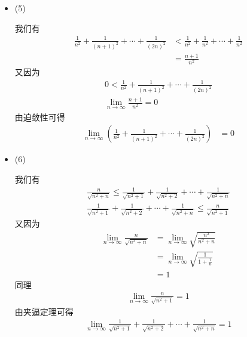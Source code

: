 \documentclass{article}
\begin{document}
\begin{itemize}
  \item (5)

        我们有
        \begin{align*}
          \frac{1}{n^2} + \frac{1}{(n + 1)^2} + \cdots + \frac{1}{(2n)^2}
           & < \frac{1}{n^2} + \frac{1}{n^2} + \cdots + \frac{1}{n^2} \\
           & = \frac{n + 1}{n^2}
        \end{align*}
        又因为
        \begin{align*}
          0 < \frac{1}{n^2} + \frac{1}{(n + 1)^2} + \cdots + \frac{1}{(2n)^2} \\
          \lim\limits_{n \to \infty} \frac{n + 1}{n^2} = 0
        \end{align*}
        由迫敛性可得
        \begin{align*}
          \lim\limits_{n \to \infty} \left(\frac{1}{n^2} + \frac{1}{(n + 1)^2} + \cdots + \frac{1}{(2n)^2}\right)
           & = 0
        \end{align*}

  \item (6)

        我们有
        \begin{align*}
          \frac{n}{\sqrt{n^2 + n}} \leq \frac{1}{\sqrt{n^2 + 1}} + \frac{1}{\sqrt{n^2 + 2}} + \cdots + \frac{1}{\sqrt{n^2 + n}} \\
          \frac{1}{\sqrt{n^2 + 1}} + \frac{1}{\sqrt{n^2 + 2}} + \cdots + \frac{1}{\sqrt{n^2 + n}} \leq \frac{n}{\sqrt{n^2 + 1}}
        \end{align*}
        又因为
        \begin{align*}
          \lim\limits_{n \to \infty} \frac{n}{\sqrt{n^2 + n}}
           & = \lim\limits_{n \to \infty} \sqrt{\frac{n^2}{n^2 + n}}       \\
           & = \lim\limits_{n \to \infty} \sqrt{\frac{1}{1 + \frac{1}{n}}} \\
           & = 1
        \end{align*}
        同理
        \begin{align*}
          \lim\limits_{n \to \infty} \frac{n}{\sqrt{n^2 + 1}} = 1
        \end{align*}
        由夹逼定理可得
        \begin{align*}
          \lim\limits_{n \to \infty} \frac{1}{\sqrt{n^2 + 1}} + \frac{1}{\sqrt{n^2 + 2}} + \cdots + \frac{1}{\sqrt{n^2 + n}} = 1
        \end{align*}

\end{itemize}
\end{document}
